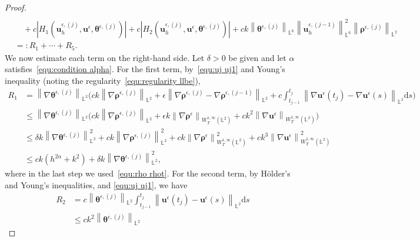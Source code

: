 \documentclass[11pt,reqno]{amsart}
\theoremstyle{definition}
\numberwithin{equation}{section}
\newcommand{\bff}{\boldsymbol}
\newcommand{\bb}{\mathbb}
\newcommand{\ds}{\mathrm{d}s}
\newcommand{\nn}{\nonumber}
\newcommand{\norm}[2]{\left\|{#1}\right\|_{#2}}
\newcommand{\abs}[1]{\left|{#1}\right|}
\begin{document}
\begin{proof}
\begin{align}
	\nn \\
	&\quad
	+
	c
	\abs{H_1(\bff{u}_h^{\epsilon, (j)},\bff{u}^\epsilon,\bff{\theta}^{\epsilon, (j)})}
 	+ 
	c
	\abs{ H_2(\bff{u}_h^{\epsilon, (j)},\bff{u}^\epsilon,\bff{\theta}^{\epsilon, (j)})}
	+
	c
	k \norm{\bff{\theta}^{\epsilon, (j)}}{\bb{L}^6}
	\norm{\bff{u}_h^{\epsilon, (j-1)}}{\bb{L}^6}^2
	\norm{\bff{\rho}^{\epsilon, (j)}}{\bb{L}^2}
	\nn\\
	&=:
	R_1 + \cdots + R_5.
\end{align}
We now estimate each term on the right-hand side. Let $\delta>0$ be given and let $\alpha$ satisfies~\eqref{equ:condition alpha}. For
the first term, by~\eqref{equ:uj uj1} and Young's inequality (noting the regularity~\eqref{equ:regularity llbe}),
\begin{align}\label{equ:llbe R1}
	R_1
	&=
	\norm{\nabla\bff{\theta}^{\epsilon, (j)}}{\bb{L}^2} 
	\Big(
		c k \norm{\nabla\bff{\rho}^{\epsilon, (j)}}{\bb{L}^2} 
		+
		\epsilon \norm{\nabla\bff{\rho}^{\epsilon, (j)}-\nabla\bff{\rho}^{\epsilon, (j-1)}}{\bb{L}^2} 
		+
		c \int_{t_{j-1}}^{t_j}
		\norm{\nabla\bff{u}^\epsilon(t_j)-\nabla\bff{u}^\epsilon(s)}{\bb{L}^2} \ds
	\Big)
	\nn\\
	&\leq
	\norm{\nabla\bff{\theta}^{\epsilon, (j)}}{\bb{L}^2} 
	\Big(
		c k \norm{\nabla\bff{\rho}^{\epsilon, (j)}}{\bb{L}^2} 
		+
		\epsilon k \norm{\nabla \bff{\rho}^{\epsilon}}{W^{1,\infty}_T(\bb{L}^2)} 
		+
		c k^2 
		\norm{\nabla \bff{u}^\epsilon}{W^{1,\infty}_T(\bb{L}^2)} 
	\Big)
	\nn\\
	&\leq
	\delta k \norm{\nabla\bff{\theta}^{\epsilon, (j)}}{\bb{L}^2}^2
	+
	ck \norm{\nabla \bff{\rho}^{\epsilon, (j)}}{\bb{L}^2}^2
	+
	c k \norm{\nabla\bff{\rho}^{\epsilon}}{W^{1,\infty}_T(\bb{L}^2)}^2
	+ 
	ck^3 \norm{\nabla\bff{u}^\epsilon}{W^{1,\infty}_T(\bb{L}^2)}^2
	\nn\\
	&\leq
    ck(h^{2\alpha}+k^2)
    +
	\delta k \norm{\nabla\bff{\theta}^{\epsilon, (j)}}{\bb{L}^2}^2,
\end{align}
where in the last step we used~\eqref{equ:rho rhot}.
For the second term, by H\"older's and Young's inequalities, and \eqref{equ:uj uj1}, we have
\begin{align*}
	R_2
	&=
	c \norm{\bff{\theta}^{\epsilon, (j)}}{\bb{L}^2} 
	\int_{t_{j-1}}^{t_j} 
	\norm{\bff{u}^\epsilon(t_j)-\bff{u}^\epsilon(s)}{\bb{L}^2} \ds
	\\
	&\leq
	c k^2
	\norm{\bff{\theta}^{\epsilon, (j)}}{\bb{L}^2} 

\end{align*}
\end{proof}
\end{document}
